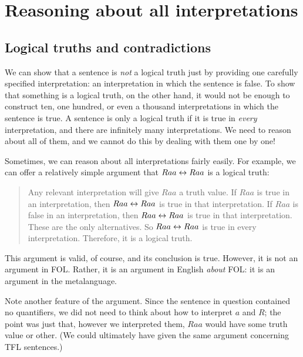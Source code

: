 \chapter{Reasoning about all interpretations}

\section{Logical truths and contradictions}
We can show that a sentence is \emph{not} a logical truth just by providing one carefully specified interpretation: an interpretation in which the sentence is false. To show that something is a logical truth, on the other hand, it would not be enough to construct ten, one hundred, or even a thousand interpretations in which the sentence is true. A sentence is only a logical truth if it is true in \emph{every} interpretation, and there are infinitely many interpretations. We need to reason about all of them, and we cannot do this by dealing with them one by one!

Sometimes, we can reason about all interpretations fairly easily. For example, we can offer a relatively simple argument that $Raa\leftrightarrow Raa$ is a logical truth:
	\begin{quote}
		\label{allmodels1}
		Any relevant interpretation will give $Raa$ a truth value. If $Raa$ is true in an interpretation, then $Raa \leftrightarrow Raa$ is true in that interpretation. If $Raa$ is false in an interpretation, then $Raa \leftrightarrow Raa$ is true in that interpretation. These are the only alternatives. So $Raa \leftrightarrow Raa$ is true in every interpretation. Therefore, it is a logical truth.
	\end{quote}
This argument is valid, of course, and its conclusion is true. However, it is not an argument in FOL. Rather, it is an argument in English \emph{about} FOL: it is an argument in the metalanguage. 

Note another feature of the argument. Since the sentence in question contained no quantifiers, we did not need to think about how to interpret $a$ and $R$; the point was just that, however we interpreted them, $Raa$ would have some truth value or other. (We could ultimately have given the same argument concerning TFL sentences.)

